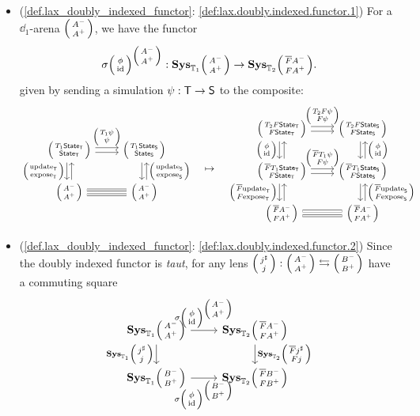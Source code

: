 \documentclass[DynamicalBook]{subfiles}
\begin{document}
\begin{itemize}
\item (\cref{def.lax_doubly_indexed_functor}: \cref{def:lax.doubly.indexed.functor.1}) For a $\dd_1$-arena $\lens{A^-}{A^+}$,
  we have the functor 
  \[
    \sigma\littlelens{\phi}{\id}^{\littlelens{A^-}{A^+}} :
    \Cat{Sys}_{\dd_1}\littlelens{A^-}{A^+} \to \Cat{Sys}_{\dd_2}\littlelens{\overline{F}A^-}{FA^+}.
  \]
given by sending a simulation $\psi : \mathsf{T} \to \mathsf{S}$ to the composite:
\[
    \begin{tikzcd}
      \lens{T_1\State{T}}{\State{T}} \ar[r, shift left, "\lens{T_1\psi}{\psi}"] \ar[r, shift right] \ar[d, shift right,
      "\lens{\update{T}}{\expose{T}}"'] \ar[d, shift left, leftarrow] &
      \lens{T_1\State{S}}{\State{S}} \ar[d, shift left, leftarrow,
      "\lens{\update{S}}{\expose{S}}"] \ar[d, shift right]\\
      \lens{A^-}{A^+} \ar[r, shift right, equals] \ar[r,
      shift left, equals] & \lens{A^-}{A^+}
    \end{tikzcd}
    \quad\mapsto\quad
    \begin{tikzcd}
      \lens{T_2F\State{T}}{F\State{T}} \ar[r, shift left,
      "\lens{T_2F\psi}{F\psi}"] \ar[r, shift right] \ar[d, shift right, "\lens{\phi}{\id}"'] \ar[d, shift left, leftarrow] &
      \lens{T_2F\State{S}}{F\State{S}} \ar[d, shift left, leftarrow,
      "\lens{\phi}{\id}"] \ar[d, shift right]\\
      \lens{\overline{F}T_1\State{T}}{F\State{T}} \ar[r, shift left, "\lens{\overline{F}T_1\psi}{F\psi}"] \ar[r, shift right] \ar[d, shift right,
      "\lens{\overline{F}\update{T}}{F\expose{T}}"'] \ar[d, shift left, leftarrow] &
      \lens{\overline{F}T_1\State{S}}{F\State{S}} \ar[d, shift left, leftarrow,
      "\lens{\overline{F}\update{S}}{F\expose{S}}"] \ar[d, shift right]\\
      \lens{\overline{F}A^-}{FA^+} \ar[r, shift right, equals] \ar[r,
      shift left, equals] & \lens{\overline{F}A^-}{FA^+}
    \end{tikzcd}
\]

\item (\cref{def.lax_doubly_indexed_functor}:
  \cref{def:lax.doubly.indexed.functor.2}) Since the doubly indexed functor is
  \emph{taut}, for any lens $\lens{j^{\sharp}}{j} : \lens{A^{-}}{A^+} \fromto \lens{B^{-}}{B^+}$ have a commuting square
  \begin{equation}
  \begin{tikzcd}
    \Cat{Sys}_{\dd_1}\littlelens{A^{-}}{A^+} \ar[d, "{\Cat{Sys}_{\dd_1}\littlelens{j^{\sharp}}{j}}"'] \ar[r, "{\sigma\littlelens{\phi}{\id}^{\littlelens{A^-}{A^+}}}"] & \Cat{Sys}_{\dd_2}\littlelens{\overline{F}A^{-}}{FA^+}  \ar[d, "{\Cat{Sys}_{\dd_2}\littlelens{\overline{F}j^{\sharp}}{Fj}}"]\\
    \Cat{Sys}_{\dd_1}\littlelens{B^{-}}{B^+} \ar[r, "{\sigma\littlelens{\phi}{\id}^{\littlelens{B^-}{B^+}}}"'] & \Cat{Sys}_{\dd_2}\littlelens{\overline{F}B^{-}}{FB^+} 
  \end{tikzcd}
  \end{equation}
  

\end{itemize}
\end{document}
